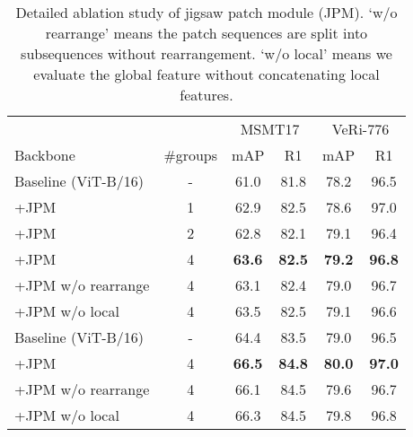 \documentclass[10pt,twocolumn,letterpaper]{article}
\begin{document}
\renewcommand{\multirowsetup}{\centering}
\begin{table}[t]
\footnotesize
    \begin{center}
    \begin{tabular}{ lc|cc|cc}
    \hline
    &  & \multicolumn{2}{c|}{MSMT17} & \multicolumn{2}{c}{VeRi-776} \\
    Backbone &\#groups    & mAP    & R1  & mAP & R1  \\
    \hline
    \hline
    Baseline (ViT-B/16)  & -       & 61.0  & 81.8  & 78.2  & 96.5 \\
    +JPM        & 1     &62.9   & 82.5  & 78.6  & 97.0 \\
    +JPM        & 2     &62.8   & 82.1  & 79.1  & 96.4\\
    +JPM        & 4     &\textbf{63.6}   & \textbf{82.5}  & \textbf{79.2}  & \textbf{96.8} \\
+JPM w/o rearrange & 4& 63.1  & 82.4  &  79.0  & 96.7 \\
    +JPM w/o local  & 4  & 63.5 & 82.5     & 79.1 & 96.6 \\
    \hline
    Baseline (ViT-B/16) & -& 64.4  & 83.5  &  79.0 & 96.5 \\
    +JPM        & 4     & \textbf{66.5} &  \textbf{84.8}&   \textbf{80.0} & \textbf{97.0}   \\
    +JPM w/o rearrange & 4&  66.1 &  84.5 & 79.6  &  96.7\\  
    +JPM w/o local  & 4     &    66.3   &  84.5   &   79.8    & 96.8 \\
    \hline
    \end{tabular}
    \end{center}
    \vspace{-1.em}
    \caption{\label{tab:jpm-all} Detailed ablation study of jigsaw patch module (JPM). `w/o rearrange' means the patch sequences are split into subsequences without rearrangement. `w/o local' means we evaluate the global feature without concatenating local features.}
    \vspace{-1.5em}
\end{table}
\end{document}
